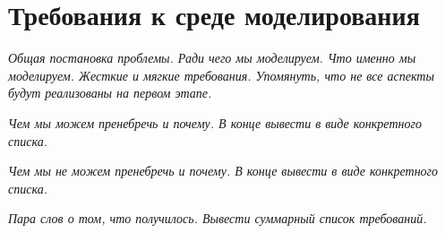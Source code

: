 \chapter{Требования к среде моделирования}

\textit{Общая постановка проблемы. Ради чего мы моделируем. Что именно мы моделируем. Жесткие и мягкие требования. Упомянуть, что не все аспекты будут реализованы на первом этапе.}

\textit{Чем мы можем пренебречь и почему. В конце вывести в виде конкретного списка.}

\textit{Чем мы не можем пренебречь и почему. В конце вывести в виде конкретного списка.}

\textit{Пара слов о том, что получилось. Вывести суммарный список требований.}